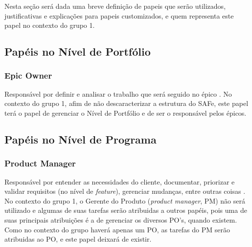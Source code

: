 Nesta seção será dada uma breve definição de papeis que serão utilizados, justificativas e explicações para papeis customizados, e quem representa este papel no contexto do grupo 1.

\subsection{Papéis no Nível de Portfólio}
\subsubsection{Epic Owner}
Responsável por definir e analisar o trabalho que será seguido no épico \cite[p. 418-419]{safe001}. No contexto do grupo 1, afim de não descaracterizar a estrutura do SAFe, este papel terá o papel de gerenciar o Nível de Portfólio e de ser o responsável pelos épicos.


\subsection{Papéis no Nível de Programa}

\subsubsection{Product Manager}
Responsável por entender as necessidades do cliente, documentar, priorizar e validar requisitos (no nível de \emph{feature}), gerenciar mudanças, entre outras coisas \cite[p. 283-287]{safe001}. No contexto do grupo 1, o Gerente do Produto (\emph{product manager}, PM) não será utilizado e algumas de suas tarefas serão atribuidas a outros papéis, pois uma de suas principais atribuições é a de gerenciar os diversos PO's, quando existem. Como no contexto do grupo haverá apenas um PO, as tarefas do PM serão atribuidas ao PO, e este papel deixará de existir. %

